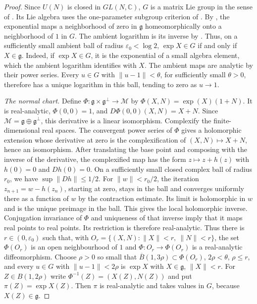 \begin{proof}
Since $U(N)$ is closed in $GL(N,\mathbb C)$, $G$ is a matrix Lie
group in the sense of \cite[Definition~2.2]{hall2000}. Its Lie algebra
uses the one-parameter subgroup criterion of \cite[Definition~3.13]{hall2000}.
By \cite[Theorem~3.23]{hall2000}, the exponential maps a neighborhood
of zero in $\mathfrak g$ homeomorphically onto a neighborhood of $1$ in $G$.
The ambient logarithm is its inverse by \cite[Theorem~3.6]{hall2000}.
Thus, on a sufficiently small ambient ball of radius
$\varepsilon_0<\log 2$, $\exp X\in G$ if and only if $X\in\mathfrak g$.
Indeed, if $\exp X\in G$, it is the exponential of a small algebra
element, which the ambient logarithm identifies with $X$. The
ambient maps are analytic by their power series. Every $u\in G$
with $\|u-1\|<\theta$, for sufficiently small $\theta>0$, therefore has
a unique logarithm in this ball, tending to zero as $u\to1$.

\emph{The normal chart.} Define
$\Phi:\mathfrak g\times\mathfrak g^\perp\to\mathcal M$ by
$\Phi(X,N)=\exp(X)(1+N)$. It is real-analytic, $\Phi(0,0)=1$, and
$D\Phi(0,0)(X,N)=X+N$. Since $\mathcal M=\mathfrak g\oplus\mathfrak g^\perp$,
this derivative is a linear isomorphism. Complexify the finite-dimensional real spaces. The convergent power series
of $\Phi$ gives a holomorphic extension whose derivative at zero is the
complexification of $(X,N)\mapsto X+N$, hence an isomorphism. After translating the base point and composing with the inverse of the
derivative, the complexified map has the form $z\mapsto z+h(z)$ with
$h(0)=0$ and $Dh(0)=0$. On a sufficiently small closed complex ball of
radius $r_0$, we have $\sup\|Dh\|\le 1/2$. For $\|w\|<r_0/2$,
the iteration $z_{n+1}=w-h(z_n)$, starting at zero, stays in the ball
and converges uniformly there as a function of $w$ by the contraction
estimate. Its limit is holomorphic in $w$ and is the unique preimage
in the ball. This gives the local holomorphic inverse.
Conjugation invariance of $\Phi$ and uniqueness of that inverse imply that
it maps real points to real points. Its restriction is therefore
real-analytic. Thus there is
$r\in(0,\varepsilon_0)$ such that, with
$O_r=\{(X,N):\|X\|<r,\ \|N\|<r\}$, the set $\Phi(O_r)$ is an open
neighbourhood of $1$ and $\Phi:O_r\to\Phi(O_r)$ is a real-analytic
diffeomorphism. Choose $\rho>0$ so small that
$\overline B(1,3\rho)\subset\Phi(O_r)$, $2\rho<\theta$, $\rho\le r$, and
every $u\in G$ with $\|u-1\|<2\rho$ is $\exp X$ with
$X\in\mathfrak g$, $\|X\|<r$. For $Z\in B(1,2\rho)$ write
$\Phi^{-1}(Z)=(X(Z),N(Z))$ and put $\pi(Z)=\exp X(Z)$. Then $\pi$ is
real-analytic and takes values in $G$, because $X(Z)\in\mathfrak g$.


\end{proof}
